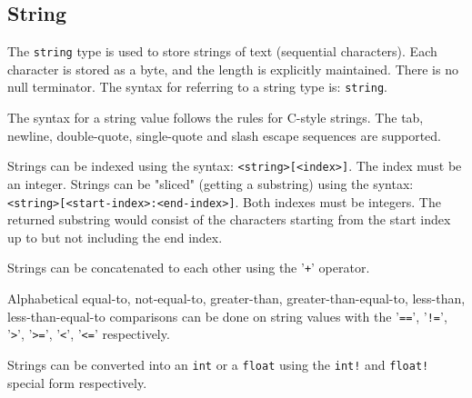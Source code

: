 
\subsection{String}
{
	The \texttt{string} type is used to store strings of
	text (sequential characters).
	Each character is stored as a byte, and the length is explicitly
	maintained. There is no null terminator.
	The syntax for referring to a string type is: \texttt{string}.
	
	The syntax for a string value follows the rules for C-style strings.
	The tab, newline, double-quote, single-quote and slash escape sequences
	are supported.
	
	Strings can be indexed using the syntax: \texttt{<string>[<index>]}. The
	index must be an integer.
	Strings can be "sliced" (getting a substring) using
	the syntax: \texttt{<string>[<start-index>:<end-index>]}. Both
	indexes must be integers. The returned substring would consist of
	the characters starting from the start index up to but not including
	the end index.
	
	Strings can be concatenated to each other using the '\texttt{+}' operator.
	
	Alphabetical equal-to, not-equal-to, greater-than, greater-than-equal-to,
	less-than, less-than-equal-to comparisons can be done on string values with
	the '\texttt{==}', '\texttt{!=}',
	'\texttt{>}', '\texttt{>=}', '\texttt{<}', '\texttt{<=}' respectively.
	
	Strings can be converted into
	an \texttt{int} or a \texttt{float} using
	the \texttt{int!} and \texttt{float!} special form respectively.
}

